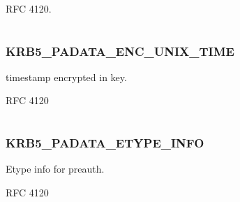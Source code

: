 \documentclass[letterpaper,10pt,english]{sphinxmanual}
\begin{document}
RFC 4120.

\begin{tabulary}{\linewidth}{|L|L|}
\hline

 & 
\\\hline
\end{tabulary}



\subsubsection{KRB5\_PADATA\_ENC\_UNIX\_TIME}
\label{appdev/refs/macros/KRB5_PADATA_ENC_UNIX_TIME:krb5-padata-enc-unix-time}\label{appdev/refs/macros/KRB5_PADATA_ENC_UNIX_TIME:krb5-padata-enc-unix-time-data}\label{appdev/refs/macros/KRB5_PADATA_ENC_UNIX_TIME::doc}

\begin{fulllineitems}
\label{appdev/refs/macros/KRB5_PADATA_ENC_UNIX_TIME:KRB5_PADATA_ENC_UNIX_TIME}
\end{fulllineitems}


timestamp encrypted in key.

RFC 4120

\begin{tabulary}{\linewidth}{|L|L|}
\hline

 & 
\\\hline
\end{tabulary}



\subsubsection{KRB5\_PADATA\_ETYPE\_INFO}
\label{appdev/refs/macros/KRB5_PADATA_ETYPE_INFO::doc}\label{appdev/refs/macros/KRB5_PADATA_ETYPE_INFO:krb5-padata-etype-info}\label{appdev/refs/macros/KRB5_PADATA_ETYPE_INFO:krb5-padata-etype-info-data}

\begin{fulllineitems}
\label{appdev/refs/macros/KRB5_PADATA_ETYPE_INFO:KRB5_PADATA_ETYPE_INFO}
\end{fulllineitems}


Etype info for preauth.

RFC 4120
\end{document}

